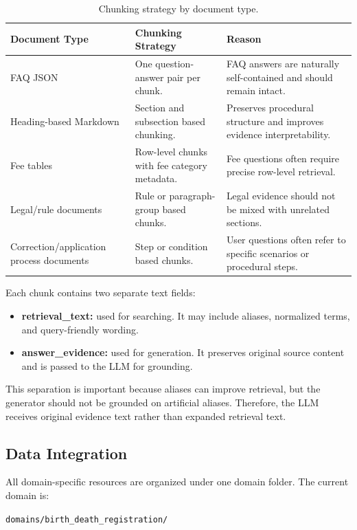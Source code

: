 \begin{table}[h]
\centering
\caption{Chunking strategy by document type.}
\begin{tabular}{|p{3.5cm}|p{5.1cm}|p{5cm}|}
\hline
\textbf{Document Type} & \textbf{Chunking Strategy} & \textbf{Reason} \\
\hline
FAQ JSON & One question-answer pair per chunk. & FAQ answers are naturally self-contained and should remain intact. \\
\hline
Heading-based Markdown & Section and subsection based chunking. & Preserves procedural structure and improves evidence interpretability. \\
\hline
Fee tables & Row-level chunks with fee category metadata. & Fee questions often require precise row-level retrieval. \\
\hline
Legal/rule documents & Rule or paragraph-group based chunks. & Legal evidence should not be mixed with unrelated sections. \\
\hline
Correction/application process documents & Step or condition based chunks. & User questions often refer to specific scenarios or procedural steps. \\
\hline
\end{tabular}
\end{table}

Each chunk contains two separate text fields:

\begin{itemize}
    \item \textbf{retrieval\_text:} used for searching. It may include aliases, normalized terms, and query-friendly wording.
    \item \textbf{answer\_evidence:} used for generation. It preserves original source content and is passed to the LLM for grounding.
\end{itemize}

This separation is important because aliases can improve retrieval, but the generator should not be grounded on artificial aliases. Therefore, the LLM receives original evidence text rather than expanded retrieval text.

\subsection{Data Integration}

All domain-specific resources are organized under one domain folder. The current domain is:

\begin{center}
\texttt{domains/birth\_death\_registration/}
\end{center}

